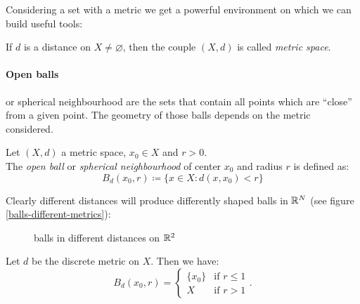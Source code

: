 Considering a set with a metric we get a powerful environment on which we can build useful tools:
\begin{defn}
	If $d$ is a distance on $X \neq \varnothing$, then the couple $\left(X,d\right)$ is called \emph{metric space}.
\end{defn} 

\paragraph{Open balls} or spherical neighbourhood are the sets that contain all points which are ``close'' from a given point. The geometry of those balls depends on the metric considered.
\begin{defn}
	Let $\left(X,d\right)$ a metric space, $x_0 \in X$ and $r>0$.\\
	The \emph{open ball} or \emph{spherical neighbourhood} of center $x_0$ and radius $r$ is defined as:
	$$ B_d \left( x_0,r \right) \coloneqq \{ x \in X : d\left(x,x_0\right) < r \} $$
\end{defn}

Clearly different distances will produce differently shaped balls in $\mathbb R^N$ (see figure \vref{balls-different-metrics}):

\begin{figure}[H]
	\centering
	\caption{balls in different distances on $\mathbb R^2$}
	\label{balls-different-metrics}
\end{figure}

\begin{exam}
	Let $d$ be the discrete metric on $X$. Then we have:
	$$
		B_d\left(x_0,r\right) = 
		\begin{cases}
			\{x_0\} & \text{if } r \leq 1 \\
			X & \text{if } r >1
		\end{cases}
	.
	$$
\end{exam}

